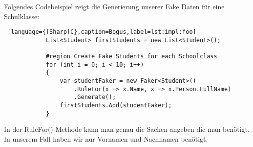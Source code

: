 Folgendes Codebeispiel zeigt die Generierung unserer Fake Daten für eine Schulklasse:\\

\begin{lstlisting} [language={[Sharp]C},caption=Bogus,label=lst:impl:foo]
            List<Student> firstStudents = new List<Student>();
                      
            #region Create Fake Students for each Schoolclass
            for (int i = 0; i < 10; i++)
            {
                var studentFaker = new Faker<Student>()
                    .RuleFor(x => x.Name, x => x.Person.FullName)
                    .Generate();
                firstStudents.Add(studentFaker);
            }
\end{lstlisting}

In der RuleFor() Methode kann man genau die Sachen angeben die man benötigt. 
In unserem Fall haben wir nur Vornamen und Nachnamen benötigt.
